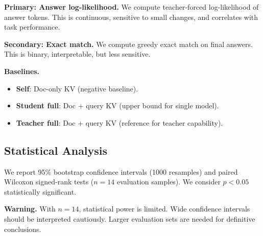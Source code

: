 \textbf{Primary: Answer log-likelihood.}
We compute teacher-forced log-likelihood of answer tokens.
This is continuous, sensitive to small changes,
and correlates with task performance.

\textbf{Secondary: Exact match.}
We compute greedy exact match on final answers.
This is binary, interpretable, but less sensitive.

\textbf{Baselines.}
\begin{itemize}
  \item \textbf{Self}: Doc-only KV (negative baseline).
  \item \textbf{Student full}: Doc + query KV (upper bound for single model).
  \item \textbf{Teacher full}: Doc + query KV (reference for teacher capability).
\end{itemize}

\subsection{Statistical Analysis}

We report 95\% bootstrap confidence intervals (1000 resamples)
and paired Wilcoxon signed-rank tests ($n = 14$ evaluation samples).
We consider $p < 0.05$ statistically significant.

\textbf{Warning.} With $n = 14$, statistical power is limited.
Wide confidence intervals should be interpreted cautiously.
Larger evaluation sets are needed for definitive conclusions.
